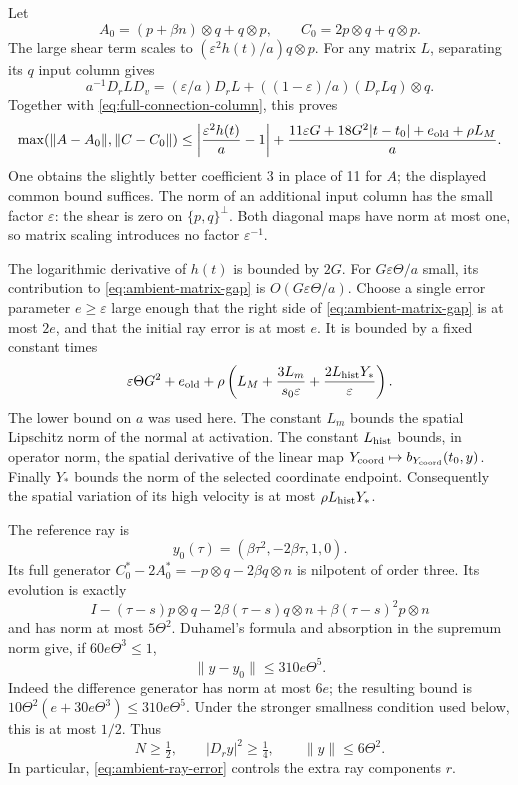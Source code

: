 \documentclass[11pt]{article}
\theoremstyle{definition}
\begin{document}
Let
\[
 A_0=(p+\beta n)\otimes q+q\otimes p,\qquad
 C_0=2p\otimes q+q\otimes p .
\]
The large shear term scales to
$(\varepsilon^2h(t)/a)q\otimes p$.
For any matrix $L$, separating its $q$ input column gives
\[
 a^{-1}D_rLD_v
 =(\varepsilon/a)D_rL+
          ((1-\varepsilon)/a)(D_rLq)\otimes q.
\]
Together with \eqref{eq:full-connection-column}, this proves
\begin{equation}\label{eq:ambient-matrix-gap}
 \max(\|A-A_0\|,\|C-C_0\|)
 \leq \left|\frac{\varepsilon^2h(t)}a-1\right|
 +\frac{11\varepsilon G+18G^2|t-t_0|+
                    e_{\rm old}+\rho L_M}{a}.
\end{equation}
One obtains the slightly better coefficient 3 in place of 11 for $A$;
the displayed common bound suffices. The norm of an additional input
column has the small factor $\varepsilon$: the shear is zero on
$\{p,q\}^\perp$. Both diagonal maps have norm at most one, so matrix
scaling introduces no factor $\varepsilon^{-1}$.

The logarithmic derivative of $h(t)$ is bounded by $2G$.
For $G\varepsilon\Theta/a$ small, its contribution to
\eqref{eq:ambient-matrix-gap} is $O(G\varepsilon\Theta/a)$.
Choose a single error parameter $e\geq\varepsilon$ large enough that
the right side of \eqref{eq:ambient-matrix-gap} is at most $2e$,
and that the initial ray error is at most $e$.
It is bounded by a fixed constant times
\begin{equation}\label{eq:ambient-error-input}
 \varepsilon\Theta G^2+
 e_{\rm old}+
 \rho\left(L_M+\frac{3L_m}{s_0\varepsilon}
          +\frac{2L_{\rm hist}Y_*}{\varepsilon}\right).
\end{equation}
The lower bound on $a$ was used here. The constant $L_m$ bounds the
spatial Lipschitz norm of the normal at activation. The constant
$L_{\rm hist}$ bounds, in operator norm, the spatial derivative of the
linear map $Y_{\rm coord}\mapsto b_{Y_{\rm coord}}(t_0,y)$.
Finally $Y_*$ bounds the norm of the selected coordinate endpoint.
Consequently the spatial variation of its high velocity is at most
$\rho L_{\rm hist}Y_*$.

The reference ray is
\[
 y_0(\tau)=(\beta\tau^2,-2\beta\tau,1,0).
\]
Its full generator $C_0^*-2A_0^*=-p\otimes q-2\beta q\otimes n$
is nilpotent of order three. Its evolution is exactly
\[
 I-(\tau-s)p\otimes q-2\beta(\tau-s)q\otimes n+
                  \beta(\tau-s)^2p\otimes n
\]
and has norm at most $5\Theta^2$.
Duhamel's formula and absorption in the supremum norm give, if
$60e\Theta^3\leq1$,
\begin{equation}\label{eq:ambient-ray-error}
 \|y-y_0\|\leq310e\Theta^5.
\end{equation}
Indeed the difference generator has norm at most $6e$; the resulting
bound is
$10\Theta^2(e+30e\Theta^3)\leq310e\Theta^5$.
Under the stronger smallness condition used below, this is at most
$1/2$. Thus
\[
 N\geq\tfrac12,\qquad |D_ry|^2\geq\tfrac14,\qquad
 \|y\|\leq6\Theta^2.
\]
In particular, \eqref{eq:ambient-ray-error} controls the extra ray components $r$.
\end{document}

